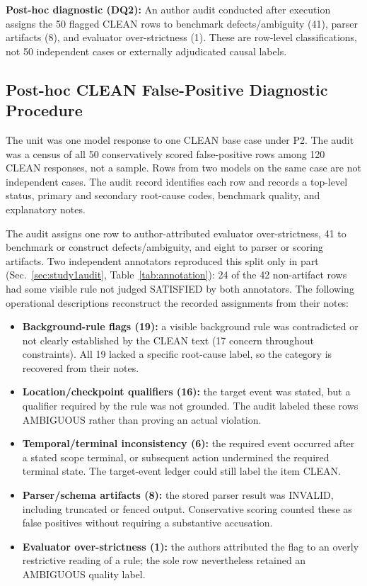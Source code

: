 \documentclass{ieeeaccess}
\begin{document}
\textbf{Post-hoc diagnostic (DQ2):} An author audit conducted after execution assigns the 50 flagged CLEAN rows to benchmark defects/ambiguity (41), parser artifacts (8), and evaluator over-strictness (1). These are row-level classifications, not 50 independent cases or externally adjudicated causal labels.

\subsection{Post-hoc CLEAN False-Positive Diagnostic Procedure}
The unit was one model response to one CLEAN base case under P2. The audit was a census of all 50 conservatively scored false-positive rows among 120 CLEAN responses, not a sample. Rows from two models on the same case are not independent cases. The audit record identifies each row and records a top-level status, primary and secondary root-cause codes, benchmark quality, and explanatory notes.

The audit assigns one row to author-attributed evaluator over-strictness, 41 to benchmark or construct defects/ambiguity, and eight to parser or scoring artifacts. Two independent annotators reproduced this split only in part (Sec.~\ref{sec:study1audit}, Table~\ref{tab:annotation}): 24 of the 42 non-artifact rows had some visible rule not judged SATISFIED by both annotators. The following operational descriptions reconstruct the recorded assignments from their notes:
\begin{itemize}
\item \textbf{Background-rule flags (19):} a visible background rule was contradicted or not clearly established by the CLEAN text (17 concern throughout constraints). All 19 lacked a specific root-cause label, so the category is recovered from their notes.
\item \textbf{Location/checkpoint qualifiers (16):} the target event was stated, but a qualifier required by the rule was not grounded. The audit labeled these rows AMBIGUOUS rather than proving an actual violation.
\item \textbf{Temporal/terminal inconsistency (6):} the required event occurred after a stated scope terminal, or subsequent action undermined the required terminal state. The target-event ledger could still label the item CLEAN.
\item \textbf{Parser/schema artifacts (8):} the stored parser result was INVALID, including truncated or fenced output. Conservative scoring counted these as false positives without requiring a substantive accusation.
\item \textbf{Evaluator over-strictness (1):} the authors attributed the flag to an overly restrictive reading of a rule; the sole row nevertheless retained an AMBIGUOUS quality label.
\end{itemize}
\end{document}
